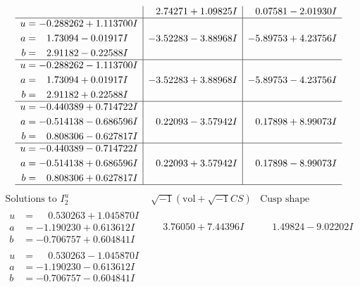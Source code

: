 \documentclass[1p]{elsarticle_modified}
\theoremstyle{definition}
\newcommand{\I}{\sqrt{-1}}
\begin{document}
$$\begin{array}{c|c|c}
 & \phantom{-}2.74271 + 1.09825 I & \phantom{-}0.07581 - 2.01930 I \\ \hline\begin{aligned}
u &= -0.288262 + 1.113700 I \\
a &= \phantom{-}1.73094 - 0.01917 I \\
b &= \phantom{-}2.91182 - 0.22588 I\end{aligned}
 & -3.52283 - 3.88968 I & -5.89753 + 4.23756 I \\ \hline\begin{aligned}
u &= -0.288262 - 1.113700 I \\
a &= \phantom{-}1.73094 + 0.01917 I \\
b &= \phantom{-}2.91182 + 0.22588 I\end{aligned}
 & -3.52283 + 3.88968 I & -5.89753 - 4.23756 I \\ \hline\begin{aligned}
u &= -0.440389 + 0.714722 I \\
a &= -0.514138 - 0.686596 I \\
b &= \phantom{-}0.808306 - 0.627817 I\end{aligned}
 & \phantom{-}0.22093 - 3.57942 I & \phantom{-}0.17898 + 8.99073 I \\ \hline\begin{aligned}
u &= -0.440389 - 0.714722 I \\
a &= -0.514138 + 0.686596 I \\
b &= \phantom{-}0.808306 + 0.627817 I\end{aligned}
 & \phantom{-}0.22093 + 3.57942 I & \phantom{-}0.17898 - 8.99073 I\\
 \hline 
 \end{array}$$\newpage$$\begin{array}{c|c|c}  
\text{Solutions to }I^u_{2}& \I (\text{vol} + \sqrt{-1}CS) & \text{Cusp shape}\\
 \hline 
\begin{aligned}
u &= \phantom{-}0.530263 + 1.045870 I \\
a &= -1.190230 + 0.613612 I \\
b &= -0.706757 + 0.604841 I\end{aligned}
 & \phantom{-}3.76050 + 7.44396 I & \phantom{-}1.49824 - 9.02202 I \\ \hline\begin{aligned}
u &= \phantom{-}0.530263 - 1.045870 I \\
a &= -1.190230 - 0.613612 I \\
b &= -0.706757 - 0.604841 I\end{aligned}

\end{array}$$
\end{document}

